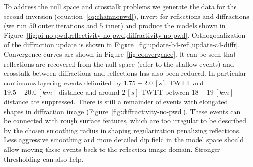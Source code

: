 To address the null space and crosstalk problems we generate the data for the second inversion (equation~\ref{eq:chainnopwd}), invert for reflections and diffractions
(we run $50$ outer iterations and $5$ inner) and produce the models shown in Figure~\ref{fig:pi-no-pwd,reflectivity-no-pwd,diffractivity-no-pwd}.
Orthogonalization of the diffraction update is shown in Figure~\ref{fig:update-b4-refl,update-a4-diffr}. Convergence curves are shown in Figure~\ref{fig:convergence}.
It can be seen that reflections are recovered from the null space (refer to the shallow events) and crosstalk between diffractions and
reflections has also been reduced. In particular continuous layering events delimited by $1.75-2.0\ [s]$ TWTT and $19.5-20.0\ [km]$ distance
and around $2\ [s]$ TWTT between $18-19\ [km]$ distance are suppressed. There is still a remainder
of events with elongated shapes in diffraction image (Figure~\ref{fig:diffractivity-no-pwd}). These events can be connected with rough surface features,
which are too irregular to be described by the chosen smoothing radius in shaping regularization penalizing reflections. 
Less aggressive smoothing and more detailed dip field in the model space should allow moving these events back to the reflection image domain.
Stronger thresholding can also help. 




